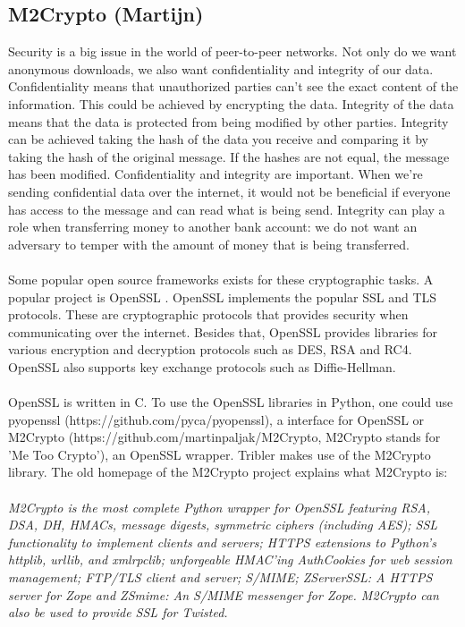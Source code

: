 \documentclass[11pt]{article}
\begin{document}
\subsection{M2Crypto (Martijn)}
Security is a big issue in the world of peer-to-peer networks. Not only do we want anonymous downloads, we also want confidentiality and integrity of our data. Confidentiality means that unauthorized parties can't see the exact content of the information. This could be achieved by encrypting the data. Integrity of the data means that the data is protected from being modified by other parties. Integrity can be achieved taking the hash of the data you receive and comparing it by taking the hash of the original message. If the hashes are not equal, the message has been modified. Confidentiality and integrity are important. When we're sending confidential data over the internet, it would not be beneficial if everyone has access to the message and can read what is being send. Integrity can play a role when transferring money to another bank account: we do not want an adversary to temper with the amount of money that is being transferred.\\\\
Some popular open source frameworks exists for these cryptographic tasks. A popular project is OpenSSL \cite{openssl}. OpenSSL implements the popular SSL and TLS protocols. These are cryptographic protocols that provides security when communicating over the internet. Besides that, OpenSSL provides libraries for various encryption and decryption protocols such as DES, RSA and RC4. OpenSSL also supports key exchange protocols such as Diffie-Hellman.\\\\
OpenSSL is written in C. To use the OpenSSL libraries in Python, one could use pyopenssl (https://github.com/pyca/pyopenssl), a interface for OpenSSL or M2Crypto (https://github.com/martinpaljak/M2Crypto, M2Crypto stands for 'Me Too Crypto'), an OpenSSL wrapper. Tribler makes use of the M2Crypto library. The old homepage of the M2Crypto project \cite{m2crypto} explains what M2Crypto is:\\\\
\emph{M2Crypto is the most complete Python wrapper for OpenSSL featuring RSA, DSA, DH, HMACs, message digests, symmetric ciphers (including AES); SSL functionality to implement clients and servers; HTTPS extensions to Python's httplib, urllib, and xmlrpclib; unforgeable HMAC'ing AuthCookies for web session management; FTP/TLS client and server; S/MIME; ZServerSSL: A HTTPS server for Zope and ZSmime: An S/MIME messenger for Zope. M2Crypto can also be used to provide SSL for Twisted.}\\\\
\end{document}
